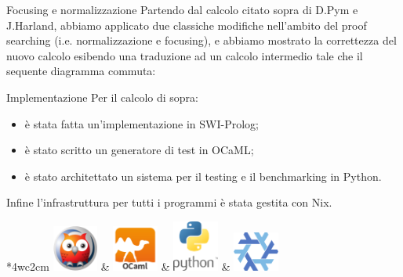 \documentclass{beamer}
\begin{document}
% 

\begin{frame}{Focusing e normalizzazione}
	Partendo dal calcolo citato sopra di D.Pym e J.Harland, abbiamo applicato due classiche modifiche nell'ambito del proof searching (i.e. normalizzazione e focusing), e abbiamo mostrato la correttezza del nuovo calcolo esibendo una traduzione ad un calcolo intermedio tale che il sequente diagramma commuta:
	\begin{center}
	\end{center}
\end{frame}

\begin{frame}{Implementazione}
	Per il calcolo di sopra:
	\begin{itemize}
		\item è stata fatta un'implementazione in SWI-Prolog;
		\item è stato scritto un generatore di test in OCaML;
		\item è stato architettato un sistema per il testing e il benchmarking in Python.
	\end{itemize}
	Infine l'infrastruttura per tutti i programmi è stata gestita con Nix.
	\begin{center}
		\begin{tabular}{*{4}{wc{2cm}}}
			\includegraphics[width=1.5cm]{images/prolog-logo} &
			\includegraphics[width=1.5cm]{images/ocaml-logo} &
			\includegraphics[width=1.5cm]{images/python-logo} &
			\includegraphics[width=1.5cm]{images/nix-logo}
		\end{tabular}
	\end{center}
\end{frame}
\end{document}
